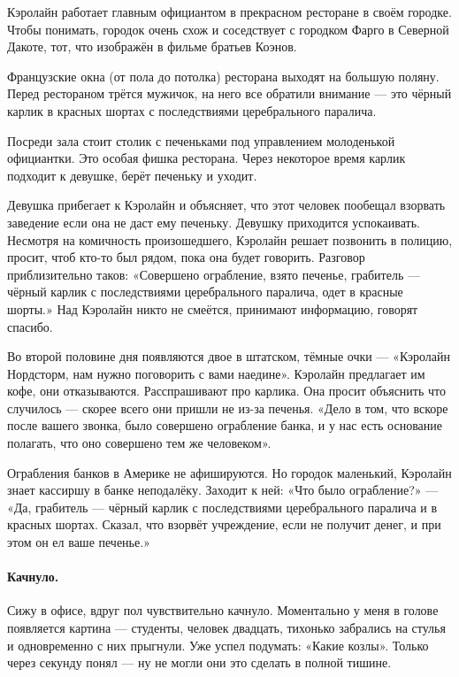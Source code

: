 \documentclass{book}
\begin{document}
Кэролайн работает главным официантом в прекрасном ресторане в своём городке.
Чтобы понимать, городок очень схож и соседствует с городком Фарго в Северной Дакоте, тот, что изображён в фильме братьев Коэнов.

Французские окна (от пола до потолка) ресторана выходят на большую поляну.
Перед рестораном трётся мужичок, на него все обратили внимание --- это чёрный карлик в красных шортах с последствиями церебрального паралича.

Посреди зала стоит столик с печеньками под управлением молоденькой официантки.
Это особая фишка ресторана.
Через некоторое время карлик подходит к девушке, берёт печеньку и уходит.

Девушка прибегает к Кэролайн и объясняет, что этот человек пообещал взорвать заведение если она не даст ему печеньку.
Девушку приходится успокаивать.
Несмотря на комичность произошедшего, Кэролайн решает позвонить в полицию, просит, чтоб кто-то был рядом, пока она будет говорить.
Разговор приблизительно таков:
«Совершено ограбление, взято печенье, грабитель --- чёрный карлик с последствиями церебрального паралича, одет в красные шорты.»
Над Кэролайн никто не смеётся, принимают информацию, говорят спасибо.

Во второй половине дня появляются двое в штатском, тёмные очки --- «Кэролайн Нордсторм, нам нужно поговорить с вами наедине».
Кэролайн предлагает им кофе, они отказываются.
Расспрашивают про карлика.
Она просит объяснить что случилось --- скорее всего они пришли не из-за печенья.
«Дело в том, что вскоре после вашего звонка, было совершено ограбление банка, и у нас есть основание полагать, что оно совершено тем же человеком».

Ограбления банков в Америке не афишируются.
Но городок маленький, Кэролайн знает кассиршу в банке неподалёку.
Заходит к ней: «Что было ограбление?» --- «Да, грабитель --- чёрный карлик с последствиями церебрального паралича и в красных шортах. Сказал, что взорвёт учреждение, если не получит денег, и
при этом он ел ваше печенье.»

\paragraph{Качнуло.}
Сижу в офисе, вдруг пол чувствительно качнуло.
Моментально у меня в голове появляется картина --- студенты, человек двадцать, тихонько забрались на стулья и одновременно с них прыгнули.
Уже успел подумать: «Какие козлы».
Только через секунду понял --- ну не могли они это сделать в полной тишине.
\end{document}
